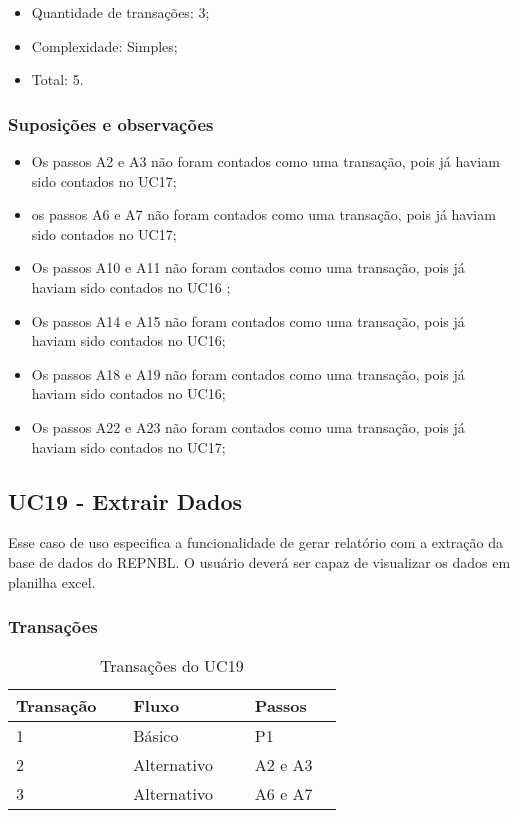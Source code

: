   \begin{itemize}
  \item Quantidade de transações: 3;
  \item Complexidade: Simples;
  \item Total: 5.
  \end{itemize}
  
  \subsubsection{Suposições e observações}
  
  \begin{itemize}
   \item Os passos A2 e A3 não foram contados como uma transação, pois já haviam sido contados no UC17;	
   \item os passos A6 e A7 não foram contados como uma transação, pois já haviam sido contados no UC17;	
   \item Os passos A10 e A11 não foram contados como uma transação, pois já haviam sido contados no UC16	;
   \item Os passos A14 e A15 não foram contados como uma transação, pois já haviam sido contados no UC16;	
   \item Os passos A18 e A19 não foram contados como uma transação, pois já haviam sido contados no UC16;
   \item Os passos A22 e A23 não foram contados como uma transação, pois já haviam sido contados no UC17;
  \end{itemize}
  
  \vfill
  
  
  
\pagebreak
\subsection{UC19 - Extrair Dados}
  
  Esse caso de uso especifica a funcionalidade de gerar relatório com a extração da base de dados do REPNBL. 
  O usuário deverá ser capaz de visualizar os dados em planilha excel.

  \subsubsection{Transações}

  \begin{table*}[!h]
  \centering
  \caption{Transações do UC19}
  \label{uc17_transactions}
    \begin{tabular}{|p{0.20\linewidth}|p{0.25\linewidth}|p{0.20\linewidth}|}
    \hline
    \textbf{Transação} & \textbf{Fluxo} & \textbf{Passos} \\ 
    \hline
    1 & Básico & P1\\
    \hline
    2 & Alternativo & A2 e A3\\
    \hline
    3 & Alternativo & A6 e A7\\
    \hline
    \end{tabular}
  \end{table*}

